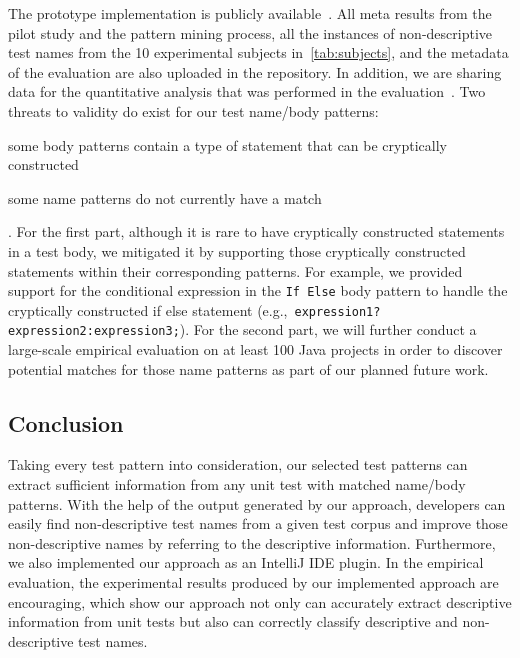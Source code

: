 \documentclass[proposal.tex]{subfiles}
\begin{document}
The prototype implementation is publicly available~\cite{prototype}.
%
All meta results from the pilot study and the pattern mining process, all the instances of non-descriptive test names from the 10 experimental subjects in~\cref{tab:subjects}, and the metadata of the evaluation are also uploaded in the repository.
%
In addition, we are sharing data for the quantitative analysis that was performed in the evaluation~\cite{evaluation_data}.
%
Two threats to validity do exist for our test name\slash body patterns:
\begin{enumerate*}
\item some body patterns contain a type of statement that can be cryptically constructed
\item some name patterns do not currently have a match
\end{enumerate*}.
%
For the first part, although it is rare to have cryptically constructed statements in a test body, we mitigated it by supporting those cryptically constructed statements within their corresponding patterns.
%
For example, we provided support for the conditional expression in the \texttt{If Else} body pattern to handle the cryptically constructed if else statement (e.g.,~\texttt{expression1?expression2:expression3;}).
%
For the second part, we will further conduct a large-scale empirical evaluation on at least \num{100} Java projects in order to discover potential matches for those name patterns as part of our planned future work.

\subsection{Conclusion}

Taking every test pattern into consideration, our selected test patterns can extract sufficient information from any unit test with matched name\slash body patterns.
%
With the help of the output generated by our approach, developers can easily find non-descriptive test names from a given test corpus and improve those non-descriptive names by referring to the descriptive information.
%
Furthermore, we also implemented our approach as an IntelliJ IDE plugin.
%
In the empirical evaluation, the experimental results produced by our implemented approach are encouraging, which show our approach not only can accurately extract descriptive information from unit tests but also can correctly classify descriptive and non-descriptive test names.
\end{document}
